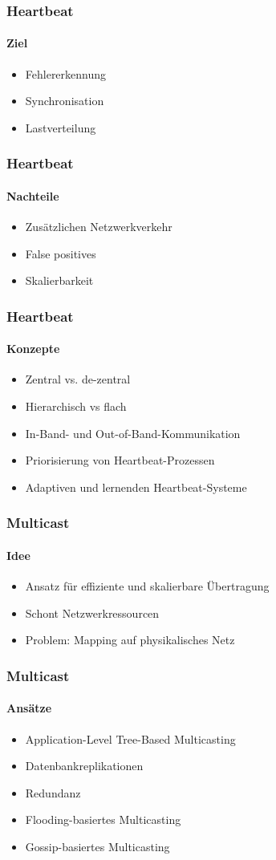 \begin{frame}
  \frametitle{Heartbeat}
  \framesubtitle{Ziel}
  \begin{itemize}
    \item Fehlererkennung
    \item Synchronisation
    \item Lastverteilung
  \end{itemize}
\end{frame}

\begin{frame}
  \frametitle{Heartbeat}
  \framesubtitle{Nachteile}
  \begin{itemize}
    \item Zusätzlichen Netzwerkverkehr
    \item False positives
    \item Skalierbarkeit
  \end{itemize}
\end{frame}

\begin{frame}
  \frametitle{Heartbeat}
  \framesubtitle{Konzepte}
  \begin{itemize}
    \item Zentral vs. de-zentral
    \item Hierarchisch vs flach
    \item In-Band- und Out-of-Band-Kommunikation
    \item Priorisierung von Heartbeat-Prozessen
    \item Adaptiven und lernenden Heartbeat-Systeme
  \end{itemize}
\end{frame}

\begin{frame}
  \frametitle{Multicast}
  \framesubtitle{Idee}
  \begin{itemize}
    \item Ansatz für effiziente und skalierbare Übertragung
    \item Schont Netzwerkressourcen
    \item Problem: Mapping auf physikalisches Netz
  \end{itemize}
\end{frame}

\begin{frame}
  \frametitle{Multicast}
  \framesubtitle{Ansätze}
  \begin{itemize}
    \item Application-Level Tree-Based Multicasting
    \item Datenbankreplikationen
    \item Redundanz
    \item Flooding-basiertes Multicasting
    \item Gossip-basiertes Multicasting
  \end{itemize}
\end{frame}

